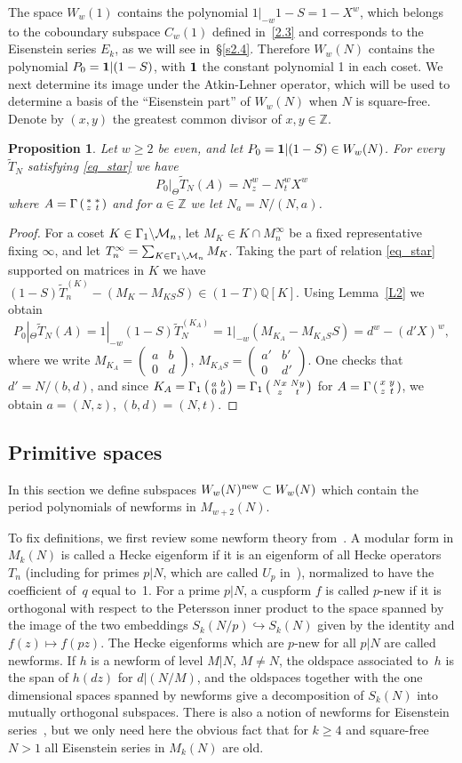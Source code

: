 \documentclass{amsart}
\theoremstyle{plain}
\newtheorem{proposition}[theorem]{Proposition}
\theoremstyle{definition}
\numberwithin{equation}{section}
\newcommand{\Z}{{\mathbb Z}}
\newcommand{\Q}{{\mathbb Q}}
\def\sm#1#2#3#4{\left(\begin{smallmatrix}#1&#2 \\ #3 & #4 \end{smallmatrix}\right)}
\newcommand{\wT}{\widetilde{T}}
\def\bsh{\backslash}
\begin{document}
The space $W_w(1)$ contains the polynomial $1|_{-w}1-S=1-X^w$, which belongs 
to the coboundary subspace $C_w(1)$ defined in~\eqref{2.3} and corresponds 
to the Eisenstein series $E_k$, as we will see in~\S\ref{s2.4}. Therefore 
$W_w(N)$ contains the polynomial $P_0={\bf 1}|(1-S)$, with ${\bf 1}$ 
the constant polynomial 1 in each coset. We next determine its image under the Atkin-Lehner
operator, which will be used to determine a basis of
the ``Eisenstein part'' of $W_w(N)$ when $N$ is square-free. Denote by $(x,y)$ the greatest common 
divisor of $x,y\in\Z$.
\begin{proposition} \label{PAL} Let $w\ge 2$ be even, and  let $P_0={\bf 1}|(1-S)\in W_w(N)$. For every
$\wT_N$ satisfying \eqref{eq_star} we have
\[P_0|_{\Theta}\wT_N(A)= N_z^w-N_t^w X^w \]
where $A=\G \sm **zt$ and for $a\in \Z$ we let $N_a=N/(N,a)$.
 \end{proposition}
\begin{proof}
For a coset $K\in \G_1\bsh \M_n $, let $M_K\in K\cap M_n^\infty$ be a 
fixed representative fixing $\infty$, and let 
$T_n^\infty=\sum_{K\in \G_1\bsh \M_n} M_K$. Taking the part
of relation \eqref{eq_star} supported on matrices in $K$ we have
 $ (1-S) \wT_n^{(K)}-( M_{K}-M_{KS}S ) \in (1-T) \Q[K].$
Using Lemma~\ref{L2} we obtain
  \[P_0|_{\Theta}\wT_N(A)=1|_{-w}(1-S)\wT_N^{(K_A)}=1|_{-w}(M_{K_A}-M_{K_A S}S)
  =d^w-(d'X)^w   , \]
where we write $M_{K_A}=\sm ab0d$, $M_{K_A S}=\sm {a'}{b'}0{d'}$. One
checks that $d'=N/(b,d)$, and since 
$K_A=\G_1\sm ab0d=\G_1 \sm {Nx}{Ny}zt$ for $A=\G \sm xyzt$, we obtain 
$a=(N,z)$, $(b,d)=(N,t)$. 
\end{proof}


\subsection{Primitive spaces} \label{s2.3}
In this section we define subspaces $W_w (N)^{\mathrm{new}}\subset W_w(N)$ which 
contain the period polynomials of newforms in $M_{w+2}(N)$. 

To fix definitions, we first review some newform theory from~\cite{AL}. A modular form 
in $M_k(N)$ is called a Hecke eigenform if it is an eigenform
of all Hecke operators $T_n$ (including for primes $p|N$, which are 
called $U_p$ in~\cite{AL}), normalized to have the coefficient 
of~$q$ equal to~1. For a prime $p|N$, a cuspform $f$ is called $p$-new
if it is orthogonal with respect to the Petersson inner product to the space 
spanned by the image of the two embeddings 
$S_k(N/p)\hookrightarrow S_k(N)$ given by the identity and $f(z)\mapsto f(pz)$. 
The Hecke eigenforms which are $p$-new for all $p|N$  are called newforms. If $h$ is a
newform of level $M|N$, $M\ne N$, the oldspace associated to~$h$ is the span of $h(dz)$
for $d | (N/M)$, and the oldspaces together with the one dimensional spaces spanned by newforms 
give a decomposition of $S_k(N)$ into mutually orthogonal subspaces. 
There is also a notion of newforms for Eisenstein series~\cite{W},  but we only
need here the obvious fact that for $k\ge 4$ and square-free~$N>1$ all Eisenstein series in $M_k(N)$ are old. 
\end{document}
